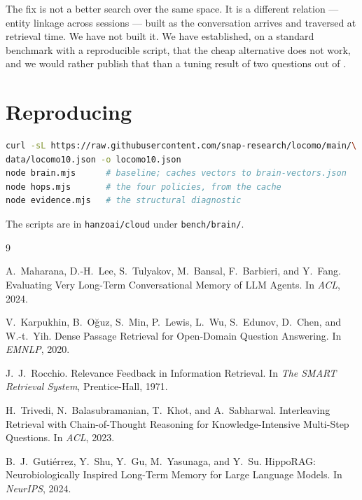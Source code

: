 The fix is not a better search over the same space. It is a different relation
--- entity linkage across sessions --- built as the conversation arrives and
traversed at retrieval time. We have not built it. We have established, on a
standard benchmark with a reproducible script, that the cheap alternative does
not work, and we would rather publish that than a tuning result of two questions
out of \rQmulti{}.

\section*{Reproducing}

\begin{lstlisting}[language=bash]
curl -sL https://raw.githubusercontent.com/snap-research/locomo/main/\
data/locomo10.json -o locomo10.json
node brain.mjs      # baseline; caches vectors to brain-vectors.json
node hops.mjs       # the four policies, from the cache
node evidence.mjs   # the structural diagnostic
\end{lstlisting}

\noindent The scripts are in \texttt{hanzoai/cloud} under \texttt{bench/brain/}.

\begin{thebibliography}{9}

A.~Maharana, D.-H.~Lee, S.~Tulyakov, M.~Bansal, F.~Barbieri, and Y.~Fang.
\newblock Evaluating Very Long-Term Conversational Memory of LLM Agents.
\newblock In \emph{ACL}, 2024.

V.~Karpukhin, B.~O\u{g}uz, S.~Min, P.~Lewis, L.~Wu, S.~Edunov, D.~Chen, and
  W.-t.~Yih.
\newblock Dense Passage Retrieval for Open-Domain Question Answering.
\newblock In \emph{EMNLP}, 2020.

J.~J.~Rocchio.
\newblock Relevance Feedback in Information Retrieval.
\newblock In \emph{The SMART Retrieval System}, Prentice-Hall, 1971.

H.~Trivedi, N.~Balasubramanian, T.~Khot, and A.~Sabharwal.
\newblock Interleaving Retrieval with Chain-of-Thought Reasoning for
  Knowledge-Intensive Multi-Step Questions.
\newblock In \emph{ACL}, 2023.

B.~J.~Guti\'errez, Y.~Shu, Y.~Gu, M.~Yasunaga, and Y.~Su.
\newblock HippoRAG: Neurobiologically Inspired Long-Term Memory for Large
  Language Models.
\newblock In \emph{NeurIPS}, 2024.

\end{thebibliography}
